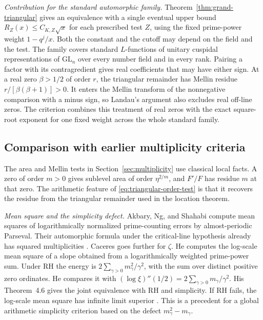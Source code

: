 \documentclass[11pt]{amsart}
\theoremstyle{definition}
\theoremstyle{remark}
\numberwithin{equation}{section}
\begin{document}
\emph{Contribution for the standard automorphic family.}
Theorem~\ref{thm:grand-triangular} gives an equivalence with a single
eventual upper bound \(R_Z(x)\leq C_{K,Z}\sqrt{x}\) for each
prescribed test \(Z\), using the fixed prime-power weight
\(1-q^j/x\). Both the constant and the cutoff may depend on the
field and the test. The family covers standard \(L\)-functions of
unitary cuspidal representations of \(\mathrm{GL}_n\) over every
number field and in every rank. Pairing a factor with its
contragredient gives real coefficients that may have either sign.
At a real zero \(\beta>1/2\) of order \(r\), the triangular
remainder has Mellin residue \(r/[\beta(\beta+1)]>0\).
It enters the Mellin transform of the nonnegative comparison with a
minus sign, so Landau's argument also excludes real off-line zeros.
The criterion combines this treatment of real zeros with the exact
square-root exponent for one fixed weight across the whole standard
family.

\subsection{Comparison with earlier multiplicity criteria}
\label{sec:multiplicity-comparison}

The area and Mellin tests in Section~\ref{sec:multiplicity} use
classical local facts. A zero of order \(m>0\) gives sublevel area
of order \(\eta^{2/m}\), and \(F'/F\) has residue \(m\) at that zero.
The arithmetic feature of \eqref{eq:triangular-order-test} is that
it recovers the residue from the triangular remainder used in the
location theorem.

\emph{Mean square and the simplicity defect.}
Akbary, Ng, and Shahabi compute mean squares of logarithmically
normalized prime-counting errors by almost-periodic Parseval.
Their automorphic formula under the critical-line hypothesis
already has squared multiplicities
\cite[Theorem~1.14 and Corollary~1.15(i)]{AkbaryNgShahabiMeanSquare}.
Caceres goes further for \(\zeta\). He computes the log-scale
mean square of a slope obtained from a logarithmically weighted
prime-power sum. Under RH the energy is
\(2\sum_{\gamma>0}m_\gamma^2/\gamma^2\), with the sum over distinct
positive zero ordinates. He compares it with
\((\log\xi)''(1/2)=2\sum_{\gamma>0}m_\gamma/\gamma^2\).
His Theorem~4.6 gives the joint equivalence with RH and simplicity.
If RH fails, the log-scale mean square has infinite limit superior
\cite[Proposition~4.1 and Theorem~4.6]{CaceresRiemannMargin}.
This is a precedent for a global arithmetic simplicity criterion
based on the defect \(m_\gamma^2-m_\gamma\).
\end{document}
